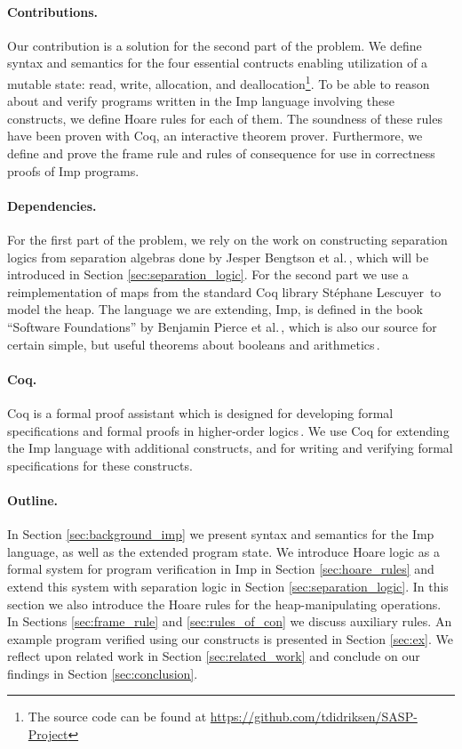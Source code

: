 \paragraph{Contributions.}
Our contribution is a solution for the second part of the problem. We define syntax and semantics for the four essential contructs enabling utilization of a mutable state: read, write, allocation, and deallocation\footnote{The source code can be found at \url{https://github.com/tdidriksen/SASP-Project}}. To be able to reason about and verify programs written in the Imp language involving these constructs, we define Hoare rules for each of them. The soundness of these rules have been proven with Coq, an interactive theorem prover. Furthermore, we define and prove the frame rule and rules of consequence for use in correctness proofs of Imp programs.

\paragraph{Dependencies.}
For the first part of the problem, we rely on the work on constructing separation logics from separation algebras done by Jesper Bengtson et al.\,\cite{BirkedalL:veroop-conf}, which will be introduced in Section \ref{sec:separation_logic}. For the second part we use a reimplementation of maps from the standard Coq library Stéphane Lescuyer\,\cite{CoqContainers} to model the heap. The language we are extending, Imp, is defined in the book ``Software Foundations'' by Benjamin Pierce et al.\,\cite{Pierce:SF}, which is also our source for certain simple, but useful theorems about booleans and arithmetics\,\cite{SfLib}.

\paragraph{Coq.}
Coq is a formal proof assistant which is designed for developing formal specifications and formal proofs in higher-order logics\,\cite{CoqIntro}. We use Coq for extending the Imp language with additional constructs, and for writing and verifying formal specifications for these constructs.

\paragraph{Outline.}
In Section \ref{sec:background_imp} we present syntax and semantics for the Imp language, as well as the extended program state. We introduce Hoare logic as a formal system for program verification in Imp in Section \ref{sec:hoare_rules} and extend this system with separation logic in Section \ref{sec:separation_logic}. In this section we also introduce the Hoare rules for the heap-manipulating operations. In Sections \ref{sec:frame_rule} and \ref{sec:rules_of_con} we discuss auxiliary rules. An example program verified using our constructs is presented in Section \ref{sec:ex}. We reflect upon related work in Section \ref{sec:related_work} and conclude on our findings in Section \ref{sec:conclusion}.